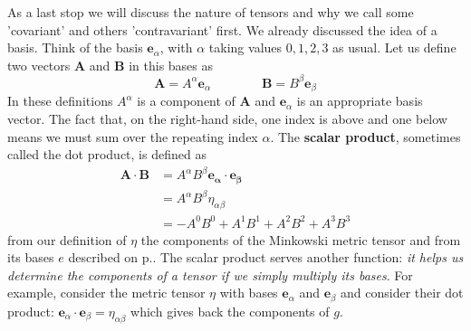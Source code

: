 \documentclass[english,seminar]{lecture}
\begin{document}
As a last stop we will discuss the nature of tensors and why we call some 'covariant' and others 'contravariant' first. We already discussed the idea of a basis. Think of the basis $\mathbf{e}_\alpha$, with $\alpha$ taking values $0, 1, 2, 3$ as usual. Let us define two vectors $\mathbf{A}$ and $\mathbf{B}$ in this bases as
$$
\mathbf{A} = A^\alpha \mathbf{e}_\alpha \qquad\qquad \mathbf{B} = B^\beta \mathbf{e}_\beta
$$
In these definitions $A^\alpha$ is a component of $\mathbf{A}$ and $\mathbf{e}_\alpha$ is an appropriate basis vector. The fact that, on the right-hand side, one index is above and one below means we must sum over the repeating index $\alpha$. The \textbf{scalar product}, sometimes called the dot product, is defined as
\begin{align}
	\mathbf{A\cdot B} &= A^\alpha B^\beta \mathbf{e_\alpha \cdot e_\beta} \nonumber\\
	&= A^\alpha B^\beta \eta_{\alpha\beta} \nonumber\\
	&= -A^0B^0 + A^1B^1 + A^2B^2 + A^3B^3 \label{eq:scalar-product}
\end{align}
from our definition of $\eta$ the components of the Minkowski metric tensor and from its bases $e$ described on p.\pageref{page:eta-bases}. The scalar product serves another function: \textit{it helps us determine the components of a tensor if we simply multiply its bases}. For example, consider the metric tensor $\eta$ with bases $\mathbf{e}_\alpha$ and $\mathbf{e}_\beta$ and consider their dot product: $\mathbf{e}_\alpha \cdot \mathbf{e}_\beta = \eta_{\alpha\beta}$ which gives back the components of $g$.
\end{document}
